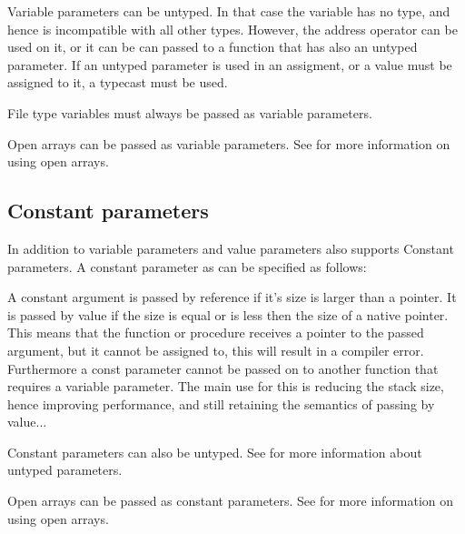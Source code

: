 Variable parameters can be untyped. In that case the variable has no type,
and hence is incompatible with all other types. However, the address operator
can be used on it, or it can be can passed to a function that has also an
untyped parameter. If an untyped parameter is used in an assigment,
or a value must be assigned to it, a typecast must be used.

File type variables must always be passed as variable parameters.

Open arrays can be passed as variable parameters. See  for
more information on using open arrays.
\subsection{Constant parameters}
In addition to variable parameters and value parameters \fpc also supports
Constant parameters. A constant parameter as can be specified as follows:

A constant argument is passed by reference if it's size is larger than a
pointer. It is passed by value if the size is equal or is less then the 
size of a native pointer.
This means that the function or procedure receives a pointer to the passed
argument, but it cannot be assigned to, this will result in a
compiler error. Furthermore a const parameter cannot be passed on to another
function that requires a variable parameter.
The main use for this is reducing the stack size, hence improving
performance, and still retaining the semantics of passing by value...

Constant parameters can also be untyped. See  for more
information about untyped parameters.

Open arrays can be passed as constant parameters. See  for
more information on using open arrays.
